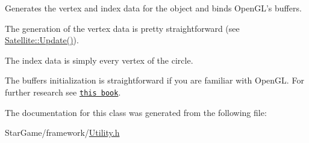 Generates the vertex and index data for the object and binds Open\-G\-L's buffers. 

The generation of the vertex data is pretty straightforward (see \hyperlink{class_satellite_a9922529e27792578c7047bb91d27e21f}{Satellite\-::\-Update()}).

The index data is simply every vertex of the circle.

The buffers initialization is straightforward if you are familiar with Open\-G\-L. For further research see \href{http://www.arcsynthesis.org/gltut/}{\tt this book}. 

The documentation for this class was generated from the following file\-:\begin{DoxyCompactItemize}
\item 
Star\-Game/framework/\hyperlink{_utility_8h}{Utility.\-h}\end{DoxyCompactItemize}
